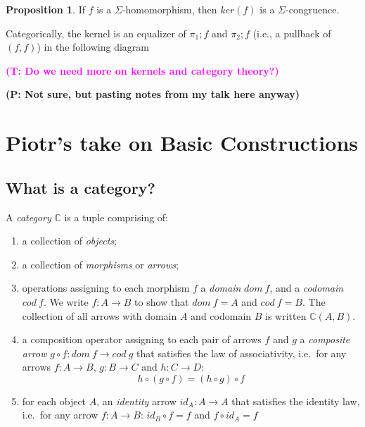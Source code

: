 \documentclass{amsart}
\theoremstyle{definition}
\newtheorem{proposition}[thm]{Proposition}
\newcommand{\truls}[1]{\textbf{\textcolor{magenta}{(T: #1)}}}
\newcommand{\piotr}[1]{\textbf{\textcolor{OliveGreen}{(P: #1)}}}
\newcommand{\acat}[1]{\mathbb{#1}} %
\begin{document}
\begin{proposition} If $f$ is a $\Sigma$-homomorphism, then $ker(f)$ is a
  $\Sigma$-congruence.
\end{proposition}

Categorically, the kernel is an equalizer of $\pi_1;f$ and $\pi_2;f$ (i.e., a pullback
of $(f,f)$) in the following diagram
\begin{center}
\end{center}

\truls{Do we need more on kernels and category theory?}

\piotr{Not sure, but pasting notes from my talk here anyway}

\section{Piotr's take on Basic Constructions}

\subsection{What is a category?}

A \emph{category} $\acat{C}$ is a tuple comprising of:

\begin{enumerate}
\item a collection of \emph{objects};
\item a collection of \emph{morphisms} or \emph{arrows};
\item  operations assigning to each morphism $f$ a \emph{domain} $dom\ f$,
  and a \emph{codomain} $cod\ f$. We write $f: A \to B$ to show that
  $dom\ f = A$ and $cod\ f = B$. The collection of all arrows with
  domain $A$ and codomain $B$ is written $\acat{C}(A,B)$.
\item a composition operator assigning to each pair of arrows $f$ and $g$ a
  \emph{composite arrow} $g\circ f: dom\ f\to cod\ g$ that satisfies the
  law of associativity, i.e.~for any arrows $f: A \to B$, $g: B\to C$
  and $h: C \to D$: \[
  h\circ (g \circ f) = (h \circ g) \circ f
  \]
\item for each object $A$, an \emph{identity} arrow $id_A: A \to A$ that
  satisfies the identity law, i.e.~for any arrow $f: A\to B$:
  $id_B \circ f = f$ and $f\circ id_A = f$
\end{enumerate}
\end{document}
